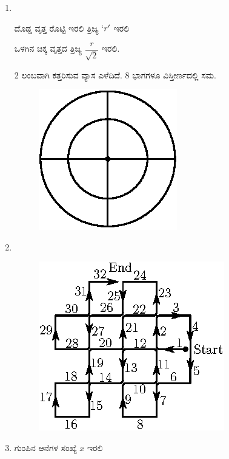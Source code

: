 \begin{enumerate}
\medskip

\item 
~

\vskip -0.5cm

\begin{minipage}[c]{5cm}
ದೊಡ್ಡ ವೃತ್ತ ರೊಟ್ಟಿ ಇರಲಿ ತ್ರಿಜ್ಯ $`r'$ ಇರಲಿ 

ಒಳಗಿನ ಚಿಕ್ಕ ವೃತ್ತದ ತ್ರಿಜ್ಯ $\dfrac{r}{\sqrt{2}}$ ಇರಲಿ. 

2 ಲಂಬವಾಗಿ ಕತ್ತರಿಸುವ ವ್ಯಾಸ ಎಳೆದಿದೆ. 8 ಭಾಗಗಳೂ ವಿಸ್ತೀರ್ಣದಲ್ಲಿ ಸಮ. 
\end{minipage}
\begin{minipage}[c]{4cm}
\begin{figure}[H]
\centering
\includegraphics{images/chap9/ans22.eps}
\end{figure}
\end{minipage}


\item 
~

\begin{figure}[H]
\centering
\includegraphics{images/chap9/ans23.eps}
\end{figure}

\eject

\item ಗುಂಪಿನ ಆನೆಗಳ ಸಂಖ್ಯೆ $x$ ಇರಲಿ 


\end{enumerate}

